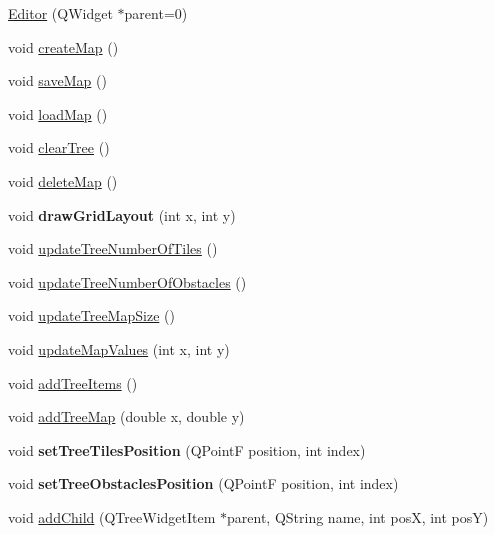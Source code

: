 \begin{DoxyCompactItemize}
\item 
\mbox{\hyperlink{class_editor_a2918aceeffbc123a96e201b0934b9b16}{Editor}} (Q\+Widget $\ast$parent=0)
\item 
void \mbox{\hyperlink{class_editor_a1641e805c7e3d2441c8658ddc9f04ed1}{create\+Map}} ()
\item 
void \mbox{\hyperlink{class_editor_add1f4b900d9c8ae6065ccd769929b617}{save\+Map}} ()
\item 
void \mbox{\hyperlink{class_editor_a392c4c8e63399e824bbac9b669287602}{load\+Map}} ()
\item 
void \mbox{\hyperlink{class_editor_a35b08c0c5641203323d8865afe4a2959}{clear\+Tree}} ()
\item 
void \mbox{\hyperlink{class_editor_a5e4c7dcadb49adcdece3235a92a5fa5c}{delete\+Map}} ()
\item 
\mbox{\label{class_editor_ad07ccb2dbdf4d50be5fdf02543c4e904}} 
void {\bfseries draw\+Grid\+Layout} (int x, int y)
\item 
void \mbox{\hyperlink{class_editor_a64370ff1f5ceddcb1e261f2360ca1f82}{update\+Tree\+Number\+Of\+Tiles}} ()
\item 
void \mbox{\hyperlink{class_editor_ab6a95acaa882cf1184e5fee306bf0d60}{update\+Tree\+Number\+Of\+Obstacles}} ()
\item 
void \mbox{\hyperlink{class_editor_af7eec42c19816c227c820871cf119dac}{update\+Tree\+Map\+Size}} ()
\item 
void \mbox{\hyperlink{class_editor_af487b4d79b6a61c4613ccf605328b708}{update\+Map\+Values}} (int x, int y)
\item 
void \mbox{\hyperlink{class_editor_a90948c660641c5e416a34ecf05c134ae}{add\+Tree\+Items}} ()
\item 
void \mbox{\hyperlink{class_editor_a567769e5c55f904085a8ed615159ffd9}{add\+Tree\+Map}} (double x, double y)
\item 
\mbox{\label{class_editor_a0b2bc4197d01bfc6c7a34645be26159e}} 
void {\bfseries set\+Tree\+Tiles\+Position} (Q\+PointF position, int index)
\item 
\mbox{\label{class_editor_ae674ecab67ac5f3842f1af550cfe60e3}} 
void {\bfseries set\+Tree\+Obstacles\+Position} (Q\+PointF position, int index)
\item 
void \mbox{\hyperlink{class_editor_a7c91cc0098ff48ec885422b6c49d27e0}{add\+Child}} (Q\+Tree\+Widget\+Item $\ast$parent, Q\+String name, int posX, int posY)

\end{DoxyCompactItemize}
